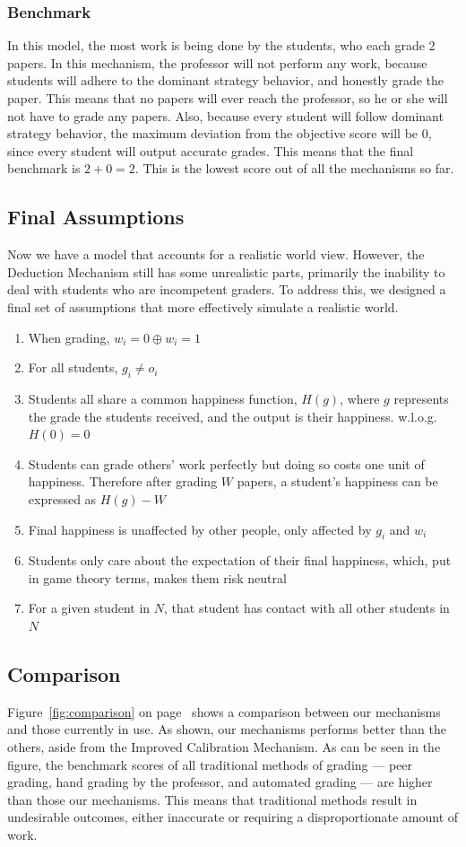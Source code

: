 \documentclass[12pt, Arial]{article}
\begin{document}
\subsubsection{Benchmark}
In this model, the most work is being done by the students, who each grade 2 papers. In this mechanism, the professor will not perform any work, because students will adhere to the dominant strategy behavior, and honestly grade the paper. This means that no papers will ever reach the professor, so he or she will not have to grade any papers. Also, because every student will follow dominant strategy behavior, the maximum deviation from the objective score will be 0, since every student will output accurate grades. This means that the final benchmark is $2+0=2$. This is the lowest score out of all the mechanisms so far.
\subsection{Final Assumptions}
Now we have a model that accounts for a realistic world view. However, the Deduction Mechanism still has some unrealistic parts, primarily the inability to deal with students who are incompetent graders. To address this, we designed a final set of assumptions that more effectively simulate a realistic world.

\begin{enumerate}[itemsep=0pt, parsep=0pt]
	\item When grading, $w_i=0 \oplus w_i=1$
	\item For all students, $g_i \neq o_i$
	\item Students all share a common happiness function, $H(g)$, where $g$ represents the grade the students received, and the output is their happiness. w.l.o.g. $H(0)=0$
	\item Students can grade others' work perfectly but doing so costs one unit of happiness. Therefore after grading $W$ papers, a student's happiness can be expressed as $H(g)-W$
	\item Final happiness is unaffected by other people, only affected by $g_i$ and $w_i$
	\item Students only care about the expectation of their final happiness, which, put in game theory terms, makes them risk neutral
	\item For a given student in $N$, that student has contact with all other students in $N$
\end{enumerate}
\subsection{Comparison}
Figure~\ref{fig:comparison} on page~\pageref{fig:comparison} shows a comparison between our mechanisms and those currently in use. As shown, our mechanisms performs better than the others, aside from the Improved Calibration Mechanism. As can be seen in the figure, the benchmark scores of all traditional methods of grading --- peer grading, hand grading by the professor, and automated grading --- are higher than those our mechanisms. This means that traditional methods result in undesirable outcomes, either inaccurate or requiring a disproportionate amount of work.
\end{document}
